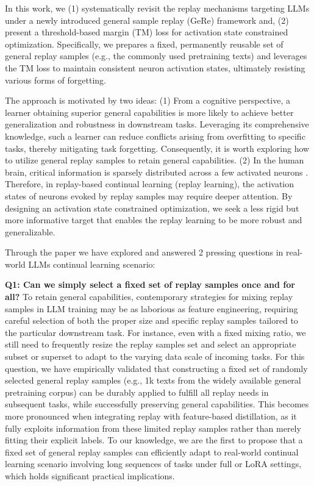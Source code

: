 In this work, we
(1) systematically revisit the replay mechanisms targeting LLMs under a newly introduced general sample replay (GeRe) framework and,
(2) present a threshold-based margin (TM) loss for activation state constrained optimization.
Specifically, we prepares a fixed, permanently reusable set of general replay samples (e.g., the commonly used pretraining texts) and leverages the TM loss to maintain consistent neuron activation states, ultimately resisting various forms of forgetting.

The approach is motivated by two ideas:
(1) From a cognitive perspective, a learner obtaining superior general capabilities is more likely to achieve better generalization and robustness in downstream tasks. Leveraging its comprehensive knowledge, such a learner can reduce conflicts arising from overfitting to specific tasks, thereby mitigating task forgetting. Consequently, it is worth exploring how to utilize general replay samples to retain general capabilities.
(2) In the human brain, critical information is sparsely distributed across a few activated neurons \cite{olshausen1996emergence,wolfe2010sparse}.
Therefore, in replay-based continual learning (replay learning), the activation states of neurons evoked by replay samples may require deeper attention. By designing an activation state constrained optimization, we seek a less rigid but more informative target that enables the replay learning to be more robust and generalizable.

Through the paper we have explored and answered 2 pressing questions in real-world LLMs continual learning scenario:

\noindent
\textbf{Q1: Can we simply select a fixed set of replay samples once and for all?}
To retain general capabilities, contemporary strategies for mixing replay samples in LLM training may be as laborious as feature engineering, requiring careful selection of both the proper size and specific replay samples tailored to the particular downstream task.
For instance, even with a fixed mixing ratio, we still need to frequently resize the replay samples set and select an appropriate subset or superset to adapt to the varying data scale of incoming tasks.
For this question, we have empirically validated that constructing a fixed set of randomly selected general replay samples (e.g., 1k texts from the widely available general pretraining corpus) can be durably applied to fulfill all replay needs in subsequent tasks, while successfully preserving general capabilities.
This becomes more pronounced when integrating replay with feature-based distillation, as it fully exploits information from these limited replay samples rather than merely fitting their explicit labels.
To our knowledge, we are the first to propose that a fixed set of general replay samples can efficiently adapt to real-world continual learning scenario involving long sequences of tasks under full or LoRA settings, which holds significant practical implications.

